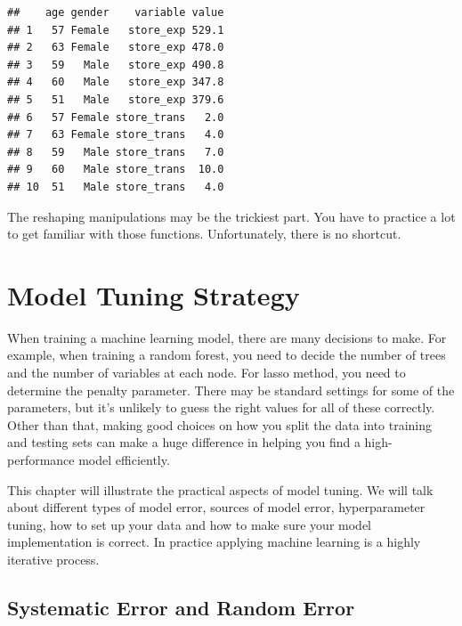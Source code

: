 \documentclass[12pt,]{krantz}
\makeatletter
\newenvironment{Shaded}{\begin{snugshade}}{\end{snugshade}}
\newcommand{\DataTypeTok}[1]{\textcolor[rgb]{0.27,0.27,0.27}{#1}}
\newcommand{\KeywordTok}[1]{\textcolor[rgb]{0.27,0.27,0.27}{\textbf{#1}}}
\newcommand{\NormalTok}[1]{#1}
\newcommand{\OperatorTok}[1]{\textcolor[rgb]{0.43,0.43,0.43}{\textbf{#1}}}
\newcommand{\StringTok}[1]{\textcolor[rgb]{0.5,0.5,0.5}{#1}}
\newenvironment{kframe}{%
\medskip{}
\setlength{\fboxsep}{.8em}
 \def\at@end@of@kframe{}%
 \ifinner\ifhmode%
  \def\at@end@of@kframe{\end{minipage}}%
  \begin{minipage}{\columnwidth}%
 \fi\fi%
 \def\FrameCommand##1{\hskip\@totalleftmargin \hskip-\fboxsep
 \colorbox{shadecolor}{##1}\hskip-\fboxsep
     \hskip-\linewidth \hskip-\@totalleftmargin \hskip\columnwidth}%
 \MakeFramed {\advance\hsize-\width
   \@totalleftmargin\z@ \linewidth\hsize
   \@setminipage}}%
 {\par\unskip\endMakeFramed%
 \at@end@of@kframe}
\renewenvironment{Shaded}{\begin{kframe}}{\end{kframe}}
\makeatother
\begin{document}
\begin{Shaded}
\end{Shaded}

\begin{verbatim}
##    age gender    variable value
## 1   57 Female   store_exp 529.1
## 2   63 Female   store_exp 478.0
## 3   59   Male   store_exp 490.8
## 4   60   Male   store_exp 347.8
## 5   51   Male   store_exp 379.6
## 6   57 Female store_trans   2.0
## 7   63 Female store_trans   4.0
## 8   59   Male store_trans   7.0
## 9   60   Male store_trans  10.0
## 10  51   Male store_trans   4.0
\end{verbatim}

The reshaping manipulations may be the trickiest part. You have to practice a lot to get familiar with those functions. Unfortunately, there is no shortcut.

\hypertarget{modeltuningstrategy}{%
\chapter{Model Tuning Strategy}\label{modeltuningstrategy}}

When training a machine learning model, there are many decisions to make. For example, when training a random forest, you need to decide the number of trees and the number of variables at each node. For lasso method, you need to determine the penalty parameter. There may be standard settings for some of the parameters, but it's unlikely to guess the right values for all of these correctly. Other than that, making good choices on how you split the data into training and testing sets can make a huge difference in helping you find a high-performance model efficiently.

This chapter will illustrate the practical aspects of model tuning. We will talk about different types of model error, sources of model error, hyperparameter tuning, how to set up your data and how to make sure your model implementation is correct. In practice applying machine learning is a highly iterative process.

\hypertarget{systematic-error-and-random-error}{%
\section{Systematic Error and Random Error}\label{systematic-error-and-random-error}}
\end{document}
